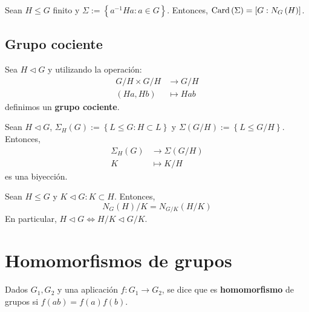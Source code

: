 \begin{prop}
    Sean $H \le G$ finito y $\Sigma := \left\{ a^{-1} H a : a \in G \right\}$. Entonces, $\operatorname{Card} \left( \Sigma \right) = \left[ G : N_G\left( H \right) \right]$.
\end{prop}

\subsection{Grupo cociente}
Sea $H \triangleleft G$ y utilizando la operación:
\begin{align*}
    G / H \times G / H &\rightarrow G / H\\
    \left( Ha, Hb \right) &\mapsto Hab
\end{align*}
definimos un \textbf{grupo cociente}.

\begin{theo}[de Correspondencia]
Sean $H \triangleleft G$, $\Sigma_{H}\left( G \right) := \left\{ L \le G : H \subset L \right\}$ y $\Sigma\left( G/H \right) := \left\{ L \le G/H \right\}$. Entonces,
\begin{align*}
    \Sigma_H \left( G \right) &\rightarrow \Sigma\left( G/H \right)\\
    K &\mapsto K/H
\end{align*}
es una biyección.
\end{theo}

\begin{lema}
Sean $H \le G$ y $K \triangleleft G : K \subset H$. Entonces,
\[
    N_G\left( H \right) / K = N_{G/K}\left( H/K \right)
\]
En particular, $H \triangleleft G \Leftrightarrow H/K \triangleleft G/K$.
\end{lema}

\section{Homomorfismos de grupos}
\begin{defi}
Dados $G_1, G_2$ y una aplicación $f: G_1 \rightarrow G_2$, se dice que es \textbf{homomorfismo} de grupos si $f\left( ab \right) = f\left( a \right)f\left( b \right)$.
\end{defi}

